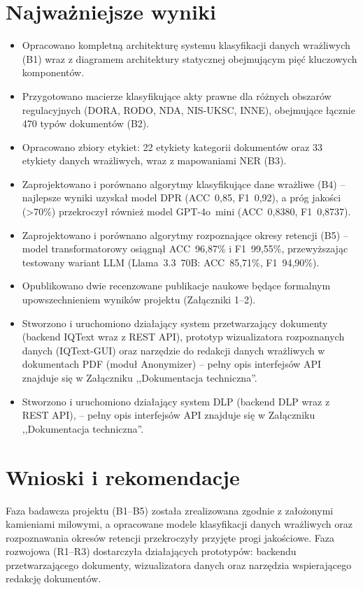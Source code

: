 \documentclass[12pt,a4paper]{report}
\begin{document}
\section{Najważniejsze wyniki}
\begin{itemize}
    \item Opracowano kompletną architekturę systemu klasyfikacji danych wrażliwych (B1) wraz z diagramem architektury statycznej obejmującym pięć kluczowych komponentów.
    \item Przygotowano macierze klasyfikujące akty prawne dla różnych obszarów regulacyjnych (DORA, RODO, NDA, NIS-UKSC, INNE), obejmujące łącznie 470 typów dokumentów (B2).
    \item Opracowano zbiory etykiet: 22 etykiety kategorii dokumentów oraz 33 etykiety danych wrażliwych, wraz z mapowaniami NER (B3).
    \item Zaprojektowano i porównano algorytmy klasyfikujące dane wrażliwe (B4) -- najlepsze wyniki uzyskał model DPR (ACC~0,85, F1~0,92), a próg jakości (>70\%) przekroczył również model GPT-4o~mini (ACC~0,8380, F1~0,8737).
    \item Zaprojektowano i porównano algorytmy rozpoznające okresy retencji (B5) -- model transformatorowy osiągnął ACC~96,87\% i F1~99,55\%, przewyższając testowany wariant LLM (Llama~3.3~70B: ACC~85,71\%, F1~94,90\%).
    \item Opublikowano dwie recenzowane publikacje naukowe będące formalnym upowszechnieniem wyników projektu (Załączniki 1--2).
    \item Stworzono i uruchomiono działający system przetwarzający dokumenty (backend IQText wraz z REST API), prototyp wizualizatora rozpoznanych danych (IQText-GUI) oraz  narzędzie do redakcji danych wrażliwych w dokumentach PDF (moduł Anonymizer) -- pełny opis interfejsów API znajduje się w Załączniku ,,Dokumentacja techniczna''.
   \item Stworzono i uruchomiono działający system DLP  (backend DLP wraz z REST API),  -- pełny opis interfejsów API znajduje się w Załączniku ,,Dokumentacja techniczna''.
\end{itemize}

\section{Wnioski i rekomendacje}
Faza badawcza projektu (B1--B5) została zrealizowana zgodnie z założonymi kamieniami milowymi, a opracowane modele klasyfikacji danych wrażliwych oraz rozpoznawania okresów retencji przekroczyły przyjęte progi jakościowe. Faza rozwojowa (R1--R3) dostarczyła działających prototypów: backendu przetwarzającego dokumenty, wizualizatora danych oraz narzędzia wspierającego redakcję dokumentów.
\end{document}
